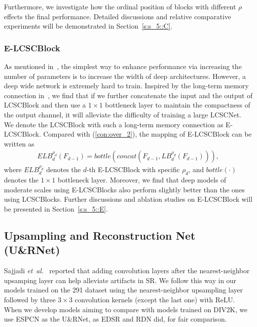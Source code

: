 \documentclass[journal]{IEEEtran}
\begin{document}
Furthermore, we investigate how the ordinal position of blocks with different $\rho$ effects the final performance. Detailed discussions and relative comparative experiments will be demonstrated in Section~\ref{s:s_5::C}.


\subsubsection{E-LCSCBlock}

As mentioned in~\cite{lim2017enhanced}, the simplest way to enhance performance via increasing the number of parameters is to increase the width of deep architectures. However, a deep wide network is extremely hard to train. 
Inspired by the long-term memory connection in~\cite{Tai-MemNet-2017}, we find that if we further concatenate the input and the output of LCSCBlock and then use a $1 \times 1$ bottleneck layer to maintain the compactness of the output channel, it will alleviate the difficulty of training a large LCSCNet. We denote the LCSCBlock with such a long-term memory connection as E-LCSCBlock. Compared with (\ref{con:over_2}), the mapping of E-LCSCBlock can be written as 
\begin{equation}
\begin{split}
ELB_{d}^{\rho_{d}}(F_{d-1})=bottle(concat(F_{d-1}, LB_{d}^{\rho_{d}}(F_{d-1}))),
\end{split}
\label{con:new_1}
\end{equation}
where $ELB_{d}^{\rho_{d}}$ denotes the $d$-th E-LCSCBlock with specific $\rho_{d}$, and $bottle(\cdot)$ denotes the $1 \times 1$ bottleneck layer. Moreover, we find that deep models of moderate scales using E-LCSCBlocks also perform slightly better than the ones using LCSCBlocks. Further discussions and ablation studies on E-LCSCBlock will be presented in Section~\ref{s:s_5::E}.


\subsection{Upsampling and Reconstruction Net (U\&RNet)}

Sajjadi \emph{et~al.}~\cite{sajjadi2016enhancenet} reported that adding convolution layers after the nearest-neighbor upsamping layer can help alleviate artifacts in SR. We follow this way in our models trained on the 291 dataset using the nearest-neighbor upsampling layer followed by three $3 \times 3$ convolution kernels (except the last one) with ReLU. When we develop models aiming to compare with models trained on DIV2K, we use ESPCN as the U\&RNet, as EDSR and RDN did, for fair comparison.
\end{document}
